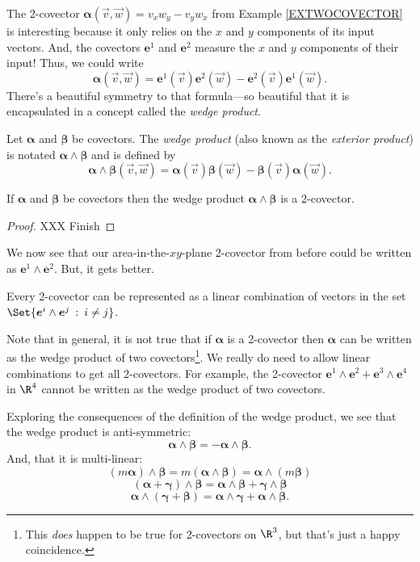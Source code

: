 The 2-covector $\bm\alpha(\vec v,\vec w) = v_xw_y-v_yw_x$ from Example \ref{EXTWOCOVECTOR}
is interesting because it only relies on the $x$ and $y$ components of its
input vectors. And, the covectors $\bm e^1$ and $\bm e^2$ measure the $x$ and
$y$ components of their input!  Thus, we could write
\[
	\bm\alpha(\vec v,\vec w) = \bm e^1(\vec v)\bm e^2(\vec w) - \bm e^2(\vec v)\bm{e}^1(\vec w).
\]
There's a beautiful symmetry to that formula---so beautiful that it is encapsulated
in a concept called the \emph{wedge product}.

\begin{definition}
	Let $\bm \alpha$ and $\bm \beta$ be covectors.  The \emph{wedge product}
	(also known as the \emph{exterior product})
	is notated $\bm\alpha\wedge\bm\beta$ and is defined by
	\[
		\bm\alpha\wedge\bm\beta (\vec v,\vec w)
		=\bm\alpha(\vec v)\bm\beta(\vec w) - \bm\beta(\vec v)\bm\alpha(\vec w).
	\]
\end{definition}

\begin{theorem}
	If $\bm \alpha$ and $\bm \beta$ be covectors then the wedge
	product $\bm\alpha\wedge\bm\beta$ is a 2-covector.
\end{theorem}
\begin{proof}
 	XXX Finish
\end{proof}

We now see that our area-in-the-$xy$-plane 2-covector from before could
be written as $\bm e^1\wedge \bm e^2$.  But, it gets better.

\begin{theorem}
	Every 2-covector can be represented as a linear combination
	of vectors in the set $\Set{\bm e^i\wedge \bm e^j\given i\neq j}$.
\end{theorem}

Note that in general, it is not true that if $\bm\alpha$ is a 2-covector
then $\bm\alpha$ can be written as the wedge product of two covectors\footnote{
This \emph{does} happen to be true for 2-covectors on $\R^3$, but that's just
a happy coincidence.}.  
We really do need to allow linear combinations to get 
all 2-covectors.  For example, the 2-covector $\bm e^1\wedge\bm e^2+\bm e^3\wedge
\bm e^4$ in $\R^4$ cannot be written as the wedge product of two covectors.

\bigskip
Exploring the consequences of the definition of the wedge product, 
we see that the wedge product is anti-symmetric:
\[
	\bm\alpha\wedge \bm \beta = -\bm\alpha\wedge \bm\beta.
\]
And, that it is multi-linear:
\[
	(m\bm\alpha)\wedge \bm \beta = m(\bm\alpha\wedge \bm \beta)
	=\bm\alpha\wedge (m \bm \beta)
\]
\[
	(\bm\alpha+\bm\gamma)\wedge \bm\beta = \bm\alpha\wedge\bm\beta + \bm\gamma\wedge \bm\beta
\]
\[
	\bm\alpha\wedge(\bm\gamma+\bm\beta) = \bm\alpha\wedge\bm\gamma + \bm\alpha\wedge\bm\beta.
\]

